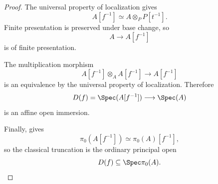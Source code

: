 \begin{proof}
The universal property of localization gives
\[
    A[f^{-1}]
    \simeq
    A\otimes_P P[t^{-1}].
\]
Finite presentation is preserved under base change, so
\[
    A
    \longrightarrow
    A[f^{-1}]
\]
is of finite presentation.

The multiplication morphism
\[
    A[f^{-1}]
    \otimes_A
    A[f^{-1}]
    \longrightarrow
    A[f^{-1}]
\]
is an equivalence by the universal property of localization. Therefore
\[
    D(f)
    =
    \Spec(A[f^{-1}])
    \longrightarrow
    \Spec(A)
\]
is an affine open immersion.

Finally,
gives
\[
    \pi_0(A[f^{-1}])
    \simeq
    \pi_0(A)[f^{-1}],
\]
so the classical truncation is the ordinary principal open
\[
    D(f)
    \subseteq
    \Spec\pi_0(A).
\]
\end{proof}

